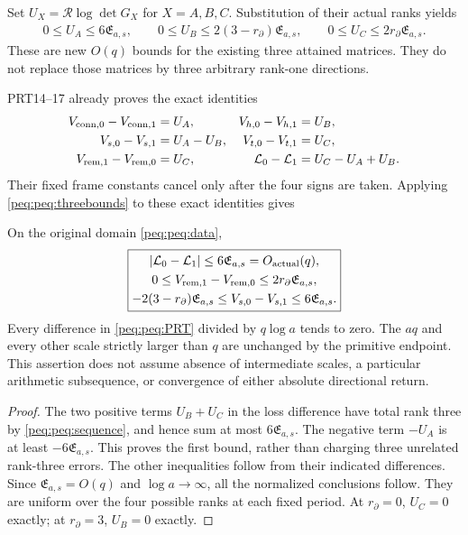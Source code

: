 Set $U_X=\mathcal R\log\det G_X$ for $X=A,B,C$. Substitution of their actual ranks yields
\begin{equation}
\boxed{\begin{gathered}
 0\le U_A\le6\mathfrak E_{a,s},\qquad
 0\le U_B\le2(3-r_\partial)\mathfrak E_{a,s},\qquad
 0\le U_C\le2r_\partial\mathfrak E_{a,s}.
\end{gathered}}\label{peq:peq:threebounds}
\end{equation}
These are new $O(q)$ bounds for the existing three attained matrices. They do not replace those matrices by three arbitrary rank-one directions.

PRT14--17 already proves the exact identities
\begin{equation}
\begin{aligned}
 V_{{\rm conn},0}-V_{{\rm conn},1}&=U_A,&
 V_{h,0}-V_{h,1}&=U_B,\\
 V_{s,0}-V_{s,1}&=U_A-U_B,&
 V_{t,0}-V_{t,1}&=U_C,\\
 V_{{\rm rem},1}-V_{{\rm rem},0}&=U_C,&
 \mathcal L_0-\mathcal L_1&=U_C-U_A+U_B.
\end{aligned}\label{peq:peq:PRT}
\end{equation}
Their fixed frame constants cancel only after the four signs are taken. Applying \eqref{peq:peq:threebounds} to these exact identities gives
\begin{theorem}
On the original domain \eqref{peq:peq:data},
\begin{equation}
\boxed{\begin{gathered}
 |\mathcal L_0-\mathcal L_1|\le6\mathfrak E_{a,s}=O_{\rm actual}(q),\\
 0\le V_{{\rm rem},1}-V_{{\rm rem},0}
                   \le2r_\partial\mathfrak E_{a,s},\\
 -2(3-r_\partial)\mathfrak E_{a,s}
 \le V_{s,0}-V_{s,1}\le6\mathfrak E_{a,s}.
\end{gathered}}\label{peq:peq:result}
\end{equation}
Every difference in \eqref{peq:peq:PRT} divided by $q\log a$ tends to zero. The $aq$ and every other scale strictly larger than $q$ are unchanged by the primitive endpoint. This assertion does not assume absence of intermediate scales, a particular arithmetic subsequence, or convergence of either absolute directional return.
\end{theorem}
\begin{proof}
The two positive terms $U_B+U_C$ in the loss difference have total rank three by \eqref{peq:peq:sequence}, and hence sum at most $6\mathfrak E_{a,s}$. The negative term $-U_A$ is at least $-6\mathfrak E_{a,s}$. This proves the first bound, rather than charging three unrelated rank-three errors. The other inequalities follow from their indicated differences. Since $\mathfrak E_{a,s}=O(q)$ and $\log a\to\infty$, all the normalized conclusions follow. They are uniform over the four possible ranks at each fixed period. At $r_\partial=0$, $U_C=0$ exactly; at $r_\partial=3$, $U_B=0$ exactly.
\end{proof}

